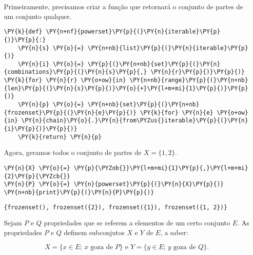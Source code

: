 \documentclass{book}
\begin{document}
        \begin{exemplo}
            Primeiramente, precisamos criar a função que retornará o conjunto de partes de um conjunto qualquer.



\begin{Verbatim}[commandchars=\\\{\},frame=single,fontsize=\small, xleftmargin=0.5em]
\PY{k}{def} \PY{n+nf}{powerset}\PY{p}{(}\PY{n}{iterable}\PY{p}{)}\PY{p}{:}
    \PY{n}{s} \PY{o}{=} \PY{n+nb}{list}\PY{p}{(}\PY{n}{iterable}\PY{p}{)}
    \PY{n}{i} \PY{o}{=} \PY{p}{(}\PY{n+nb}{set}\PY{p}{(}\PY{n}{combinations}\PY{p}{(}\PY{n}{s}\PY{p}{,} \PY{n}{r}\PY{p}{)}\PY{p}{)} \PY{k}{for} \PY{n}{r} \PY{o+ow}{in} \PY{n+nb}{range}\PY{p}{(}\PY{n+nb}{len}\PY{p}{(}\PY{n}{s}\PY{p}{)}\PY{o}{+}\PY{l+m+mi}{1}\PY{p}{)}\PY{p}{)}
    \PY{n}{p} \PY{o}{=} \PY{n+nb}{set}\PY{p}{(}\PY{n+nb}{frozenset}\PY{p}{(}\PY{n}{e}\PY{p}{)} \PY{k}{for} \PY{n}{e} \PY{o+ow}{in} \PY{n}{chain}\PY{o}{.}\PY{n}{from\PYZus{}iterable}\PY{p}{(}\PY{n}{i}\PY{p}{)}\PY{p}{)}
    \PY{k}{return} \PY{n}{p}
\end{Verbatim}

            Agora, geramos todos o conjunto de partes de $X=\{1,2\}$.



\begin{Verbatim}[commandchars=\\\{\},frame=single,fontsize=\small, xleftmargin=0.5em]
\PY{n}{X} \PY{o}{=} \PY{p}{\PYZob{}}\PY{l+m+mi}{1}\PY{p}{,}\PY{l+m+mi}{2}\PY{p}{\PYZcb{}}
\PY{n}{P} \PY{o}{=} \PY{n}{powerset}\PY{p}{(}\PY{n}{X}\PY{p}{)}
\PY{n+nb}{print}\PY{p}{(}\PY{n}{P}\PY{p}{)}
\end{Verbatim}

\begin{Verbatim}[commandchars=\\\{\},frame=leftline,fontsize=\small, xleftmargin=0.5em]
{frozenset(), frozenset({2}), frozenset({1}), frozenset({1, 2})}
\end{Verbatim}

        \end{exemplo}

        Sejam $P$ e $Q$ propriedades que se referem a elementos de um certo conjunto $E$. As propriedades $P$ e $Q$ definem subconjutos $X$ e $Y$ de $E$, a saber:

        $$ X = \{ x \in E \text{; } x \text{ goza de } P\} \text{ e } Y = \{ y \in E \text{; } y \text{ goza de } Q\} \text{.}$$
\end{document}
